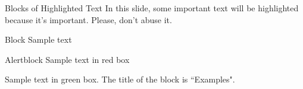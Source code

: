 \documentclass[aspectratio=169,xcolor=dvipsnames, t]{beamer}
\begin{document}
    \begin{frame}{Blocks of Highlighted Text}
        In this slide, some important text will be \alert{highlighted} because it's important. Please, don't abuse it.       
        \begin{block}{Block}
            Sample text
        \end{block}
                
        \begin{alertblock}{Alertblock}
            Sample text in red box
        \end{alertblock}
                
        \begin{examples}
            Sample text in green box. The title of the block is ``Examples".
        \end{examples}
    \end{frame}
\end{document}
